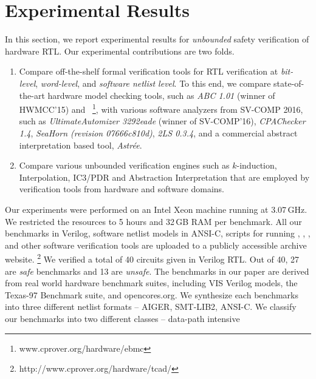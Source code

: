 \section{Experimental Results}
In this section, we report experimental results for \emph{unbounded} safety 
verification of hardware RTL.  Our experimental contributions are two folds.
%
\begin{enumerate}
  \item Compare off-the-shelf formal verification tools for RTL verification at 
    \emph{bit-level}, \emph{word-level}, and \emph{software netlist level}.  
    To this end, we compare state-of-the-art hardware model checking tools, such as 
    \emph{ABC 1.01} (winner of HWMCC'15) and 
    \ebmcv~\footnote{\scriptsize{www.cprover.org/hardware/ebmc}}, 
    with various software analyzers from SV-COMP 2016, such as 
    \emph{UltimateAutomizer 3292eade} (winner of SV-COMP'16), 
    \emph{CPAChecker 1.4}, 
    \emph{SeaHorn (revision 07666c810d)}, \emph{2LS 0.3.4}, 
    and a commercial abstract 
    interpretation based tool, \emph{Astr{\'e}e}.  
  
 \item  Compare various unbounded verification engines such as $k$-induction, 
    Interpolation, IC3/PDR and Abstraction Interpretation that are employed by 
    verification tools from hardware and software domains.
\end{enumerate}
%
Our experiments were performed on an Intel Xeon machine running at
3.07\,GHz.  We restricted the resources to 5 hours and 32\,GB RAM per
benchmark.  All our benchmarks in Verilog, software netlist models in 
ANSI-C, scripts for running \yosys, \ABC, \ebmcv, and other software 
verification tools are uploaded to a publicly accessible archive website.
\footnote{\scriptsize{http://www.cprover.org/hardware/tcad/}}
%
%
We verified a total of 40 circuits given in Verilog RTL.  Out of 40, 27 
are \emph{safe} benchmarks and 13 are \emph{unsafe}.  The benchmarks in 
our paper are derived from real world hardware benchmark suites, including 
VIS Verilog models, the Texas-97 Benchmark suite, and opencores.org. We synthesize 
each benchmarks into three different netlist formats -- AIGER, SMT-LIB2, ANSI-C.
We classify our benchmarks into two different classes -- data-path intensive
